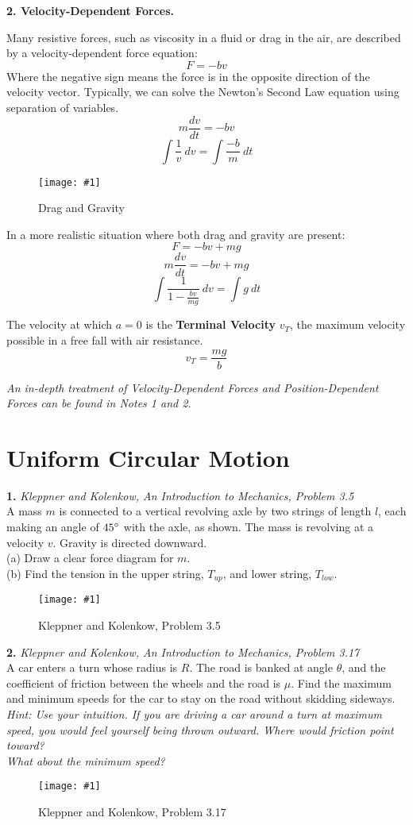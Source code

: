 \documentclass[11pt]{article}
\newcommand{\fig}[4]{
    \begin{figure}[H]
        \centering
        \texttt{[image: \#1]}
        \caption{#2}
        \label{exp4fit}
    \end{figure}
}
\theoremstyle{gangnamstyle}{\newtheorem{definition}{Definition}[]}
\theoremstyle{gangnamstyle}{\newtheorem{example}{Example}[]}
\theoremstyle{gangnamstyle}{\newtheorem{problem}{Problem}[]}
\begin{document}
\pagebreak

\textbf{2. Velocity-Dependent Forces.}

Many resistive forces, such as viscosity in a fluid or drag in the air, are described by a velocity-dependent force equation: 
\[ F = -bv \]
Where the negative sign means the force is in the opposite direction of the velocity vector. Typically, we can solve the Newton's Second Law equation using separation of variables. 
\[ m\frac{dv}{dt} = -bv \]
\[ \int \frac{1}{v} \ dv = \int \frac{-b}{m} \ dt \]

\fig{figs/0702/drag.png}{Drag and Gravity}{0.65}{0}

In a more realistic situation where both drag and gravity are present: 
\[ F = -bv + mg \]
\[ m\frac{dv}{dt} = -bv + mg \]
\[ \int \frac{1}{1 - \frac{bv}{mg}} \ dv = \int g \ dt \]

The velocity at which $a = 0$ is the \textbf{Terminal Velocity} $v_T$, the maximum velocity possible in a free fall with air resistance. 
\[ v_T = \frac{mg}{b} \]

\textit{An in-depth treatment of Velocity-Dependent Forces and Position-Dependent Forces can be found in Notes 1 and 2. }

\pagebreak

\section{Uniform Circular Motion}
\textbf{1.} \textit{Kleppner and Kolenkow, An Introduction to Mechanics, Problem 3.5} \\
A mass $m$ is connected to a vertical revolving axle by two strings of length $l$, each making an angle of $45\degree$ with the axle, as shown. The mass is revolving at a velocity $v$. Gravity is directed downward. \\
(a) Draw a clear force diagram for $m$. \\
(b) Find the tension in the upper string, $T_{up}$, and lower string, $T_{low}$. 
\fig{figs/0627/kk35.png}{Kleppner and Kolenkow, Problem 3.5}{0.6}{0}

\pagebreak

\textbf{2.} \textit{Kleppner and Kolenkow, An Introduction to Mechanics, Problem 3.17} \\
A car enters a turn whose radius is $R$. The road is banked at angle $\theta$, and the coefficient of friction between the wheels and the road is $\mu$. Find the maximum and minimum speeds for the car to stay on the road without skidding sideways. \\
\textit{Hint: Use your intuition. If you are driving a car around a turn at maximum speed, you would feel yourself being thrown outward. Where would friction point toward? \\
What about the minimum speed?}
\fig{figs/0627/kk317.png}{Kleppner and Kolenkow, Problem 3.17}{0.7}{0}
\end{document}
